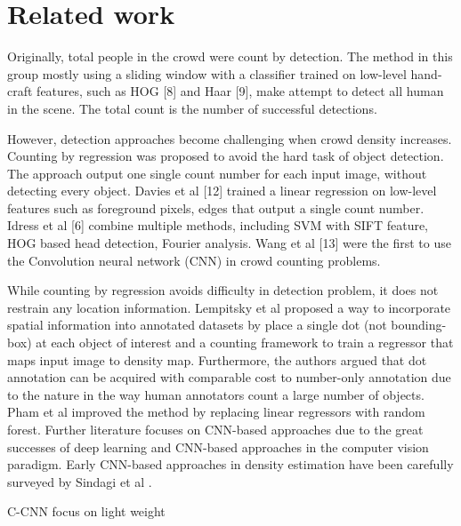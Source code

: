 \section{Related work}
Originally, total people in the crowd were count by detection. The method in this group mostly using a sliding window with a classifier trained on low-level hand-craft features, such as HOG [8] and Haar [9], make attempt to detect all human in the scene. The total count is the number of successful detections.

However, detection approaches become challenging when crowd density increases. Counting by regression was proposed to avoid the hard task of object detection. The approach output one single count number for each input image, without detecting every object. Davies et al [12] trained a linear regression on low-level features such as foreground pixels, edges that output a single count number. Idress et al [6] combine multiple methods, including SVM with SIFT feature, HOG based head detection, Fourier analysis. Wang et al [13] were the first to use the Convolution neural network (CNN) in crowd counting problems.

While counting by regression avoids difficulty in detection problem, it does not restrain any location information. Lempitsky et al \cite{lempitsky2010learning} proposed a way to incorporate spatial information into annotated datasets by place a single dot (not bounding-box) at each object of interest and a counting framework to train a regressor that maps input image to density map. Furthermore, the authors argued that dot annotation can be acquired with comparable cost to number-only annotation due to the nature in the way human annotators count a large number of objects. Pham et al \cite{7410729} improved the method by replacing linear regressors with random forest. Further literature focuses on CNN-based approaches due to the great successes of deep learning and CNN-based approaches in the computer vision paradigm. Early CNN-based approaches in density estimation have been carefully surveyed by Sindagi et al \cite{SINDAGI20183}.




C-CNN \cite{9053780} focus on light weight 